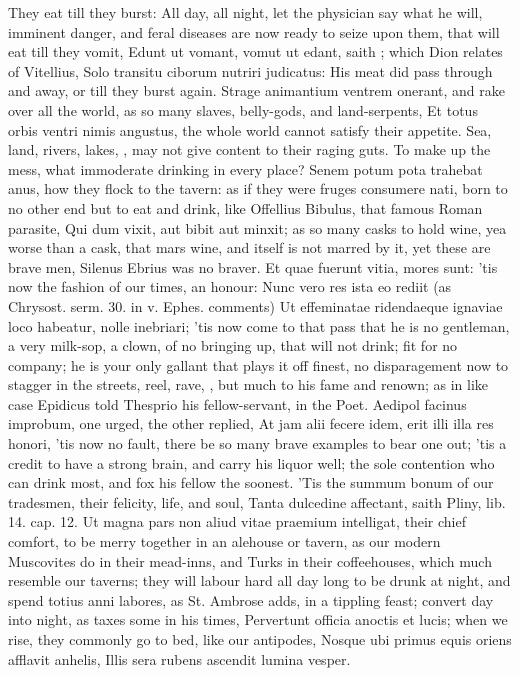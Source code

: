 {{They eat till they burst: All day, all night, let the physician
say what he will, imminent danger, and feral diseases are now ready to
seize upon them, that will eat till they vomit, Edunt ut vomant, vomut
ut edant, saith \Seneca; which Dion relates of Vitellius, Solo transitu
ciborum nutriri judicatus: His meat did pass through and away, or till
they burst again. Strage animantium ventrem onerant, and rake
over all the world, as so many slaves, belly-gods, and
land-serpents, Et totus orbis ventri nimis angustus, the whole world
cannot satisfy their appetite. Sea, land, rivers, lakes, \etc{}, may
not give content to their raging guts. To make up the mess, what
immoderate drinking in every place? Senem potum pota trahebat anus, how
they flock to the tavern: as if they were fruges consumere nati, born
to no other end but to eat and drink, like Offellius Bibulus, that
famous Roman parasite, Qui dum vixit, aut bibit aut minxit; as so many
casks to hold wine, yea worse than a cask, that mars wine, and itself
is not marred by it, yet these are brave men, Silenus Ebrius was no
braver. Et quae fuerunt vitia, mores sunt: 'tis now the fashion of our
times, an honour: Nunc vero res ista eo rediit (as Chrysost. serm. 30.
in v. Ephes. comments) Ut effeminatae ridendaeque ignaviae loco
habeatur, nolle inebriari; 'tis now come to that pass that he is no
gentleman, a very milk-sop, a clown, of no bringing up, that will not
drink; fit for no company; he is your only gallant that plays it off
finest, no disparagement now to stagger in the streets, reel, rave,
\etc{}, but much to his fame and renown; as in like case Epidicus told
Thesprio his fellow-servant, in the Poet. Aedipol facinus
improbum, one urged, the other replied, At jam alii fecere idem, erit
illi illa res honori, 'tis now no fault, there be so many brave
examples to bear one out; 'tis a credit to have a strong brain, and
carry his liquor well; the sole contention who can drink most, and fox
his fellow the soonest. 'Tis the summum bonum of our tradesmen, their
felicity, life, and soul, Tanta dulcedine affectant, saith Pliny, lib.
14. cap. 12. Ut magna pars non aliud vitae praemium intelligat, their
chief comfort, to be merry together in an alehouse or tavern, as our
modern Muscovites do in their mead-inns, and Turks in their
coffeehouses, which much resemble our taverns; they will labour hard
all day long to be drunk at night, and spend totius anni labores, as
St. Ambrose adds, in a tippling feast; convert day into night, as
\Seneca taxes some in his times, Pervertunt officia anoctis et lucis;
when we rise, they commonly go to bed, like our antipodes,
Nosque ubi primus equis oriens afflavit anhelis,
Illis sera rubens ascendit lumina vesper.

}}
